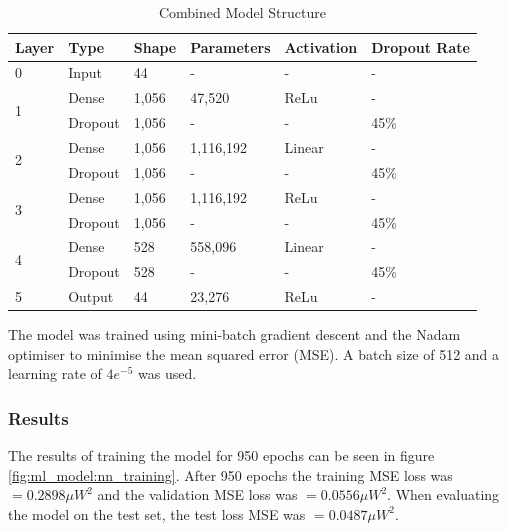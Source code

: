 \begin{table}[h]
    \centering
    \caption{Combined Model Structure}
    \begin{tabular}{l l l l l l }
        \textbf{Layer} & \textbf{Type} & \textbf{Shape} & \textbf{Parameters} & \textbf{Activation} & \textbf{Dropout Rate} \\
        \hline
        0 & Input & 44 & - & - & - \\
        \hline
        \multirow[t]{2}{*}{1} & Dense & 1,056 & 47,520 & ReLu  & - \\ \cline{2-6}
        
        & Dropout & 1,056 & - & - & 45\% \\
        \hline
        \multirow[t]{2}{*}{2} & Dense & 1,056 & 1,116,192 & Linear  & - \\  \cline{2-6}
        
        & Dropout & 1,056 & - & - & 45\% \\
        \hline
        \multirow[t]{2}{*}{3} &  Dense & 1,056 & 1,116,192 & ReLu  & - \\ \cline{2-6}
        
        & Dropout & 1,056 & - & - & 45\% \\
        \hline
        \multirow[t]{2}{*}{4} & Dense & 528 & 558,096 & Linear  & - \\ \cline{2-6}
        
        & Dropout & 528 & - & - & 45\% \\
        \hline
        5 &Output & 44 & 23,276 & ReLu & - \\
        \hline
    \end{tabular}
    \label{tab:combined_model_struct}
\end{table}

The model was trained using mini-batch gradient descent and the Nadam optimiser to minimise the mean squared error (MSE). A batch size of 512 and a learning rate of $4e^{-5}$ was used.

\subsubsection{Results}
\FloatBarrier


The results of training the model for 950 epochs can be seen in figure \ref{fig:ml_model:nn_training}. After 950 epochs the training MSE loss was $= 0.2898\mu W^2$ and the validation MSE loss was $= 0.0556\mu W^2$. When evaluating the model on the test set, the test loss MSE was $= 0.0487\mu W^2$. 

